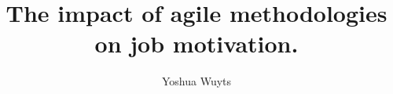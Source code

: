 \documentclass[doc, 12pt, a4paper]{apa6}
\title{The impact of agile methodologies on job motivation.}
\author{Yoshua Wuyts}
\affiliation{Vrije Universiteit Amsterdam}
\begin{document}
%
%

\maketitle
\rmfamily
\clearpage

%
%

%

%
%


%
\end{document}
